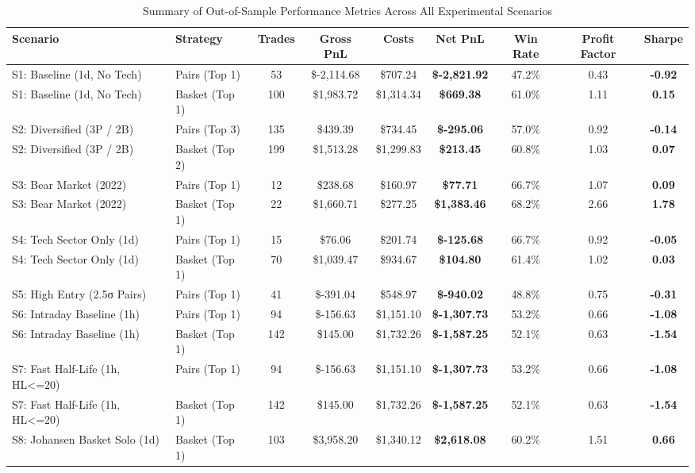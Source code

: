 \begin{table}[H]
\centering
\caption{Summary of Out-of-Sample Performance Metrics Across All Experimental Scenarios}
\label{tab:master_results}
\small
\begin{tabular}{llccccccc}
\toprule
\textbf{Scenario} & \textbf{Strategy} & \textbf{Trades} & \textbf{Gross PnL} & \textbf{Costs} & \textbf{Net PnL} & \textbf{Win Rate} & \textbf{Profit Factor} & \textbf{Sharpe} \\
\midrule
S1: Baseline (1d, No Tech) & Pairs (Top 1) & 53 & \$-2,114.68 & \$707.24 & \textbf{\$-2,821.92} & 47.2\% & 0.43 & \textbf{-0.92} \\
S1: Baseline (1d, No Tech) & Basket (Top 1) & 100 & \$1,983.72 & \$1,314.34 & \textbf{\$669.38} & 61.0\% & 1.11 & \textbf{0.15} \\
S2: Diversified (3P / 2B) & Pairs (Top 3) & 135 & \$439.39 & \$734.45 & \textbf{\$-295.06} & 57.0\% & 0.92 & \textbf{-0.14} \\
S2: Diversified (3P / 2B) & Basket (Top 2) & 199 & \$1,513.28 & \$1,299.83 & \textbf{\$213.45} & 60.8\% & 1.03 & \textbf{0.07} \\
S3: Bear Market (2022) & Pairs (Top 1) & 12 & \$238.68 & \$160.97 & \textbf{\$77.71} & 66.7\% & 1.07 & \textbf{0.09} \\
S3: Bear Market (2022) & Basket (Top 1) & 22 & \$1,660.71 & \$277.25 & \textbf{\$1,383.46} & 68.2\% & 2.66 & \textbf{1.78} \\
S4: Tech Sector Only (1d) & Pairs (Top 1) & 15 & \$76.06 & \$201.74 & \textbf{\$-125.68} & 66.7\% & 0.92 & \textbf{-0.05} \\
S4: Tech Sector Only (1d) & Basket (Top 1) & 70 & \$1,039.47 & \$934.67 & \textbf{\$104.80} & 61.4\% & 1.02 & \textbf{0.03} \\
S5: High Entry (2.5σ Pairs) & Pairs (Top 1) & 41 & \$-391.04 & \$548.97 & \textbf{\$-940.02} & 48.8\% & 0.75 & \textbf{-0.31} \\
S6: Intraday Baseline (1h) & Pairs (Top 1) & 94 & \$-156.63 & \$1,151.10 & \textbf{\$-1,307.73} & 53.2\% & 0.66 & \textbf{-1.08} \\
S6: Intraday Baseline (1h) & Basket (Top 1) & 142 & \$145.00 & \$1,732.26 & \textbf{\$-1,587.25} & 52.1\% & 0.63 & \textbf{-1.54} \\
S7: Fast Half-Life (1h, HL<=20) & Pairs (Top 1) & 94 & \$-156.63 & \$1,151.10 & \textbf{\$-1,307.73} & 53.2\% & 0.66 & \textbf{-1.08} \\
S7: Fast Half-Life (1h, HL<=20) & Basket (Top 1) & 142 & \$145.00 & \$1,732.26 & \textbf{\$-1,587.25} & 52.1\% & 0.63 & \textbf{-1.54} \\
S8: Johansen Basket Solo (1d) & Basket (Top 1) & 103 & \$3,958.20 & \$1,340.12 & \textbf{\$2,618.08} & 60.2\% & 1.51 & \textbf{0.66} \\
\bottomrule
\end{tabular}
\end{table}